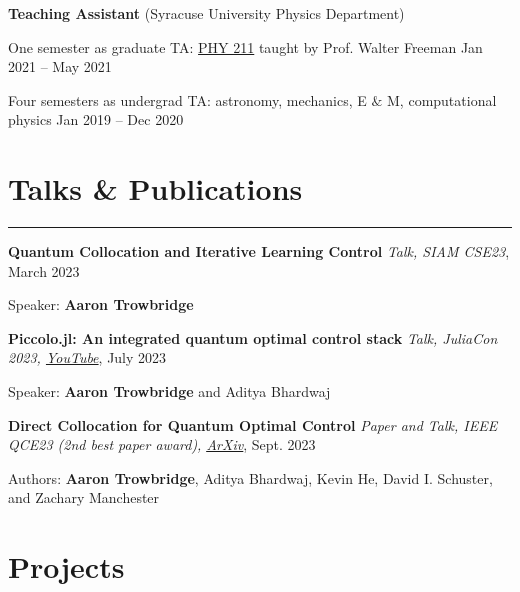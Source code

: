 \documentclass[9pt]{extarticle}
\newcommand{\myline}{\rule[\baselineskip]{\linewidth}{1pt}}
\begin{document}
\vspace{7pt}
\large\textbf{Teaching Assistant} \normalsize (Syracuse University Physics Department)

\begin{compactitem}
\normalsize
\item One semester as graduate TA: \href{https://walterfreeman.github.io/phy211/}{PHY 211} taught by Prof. Walter Freeman \hfill \small Jan 2021 -- May 2021 \normalsize
\item Four semesters as undergrad TA: astronomy, mechanics, E $\&$ M, computational physics  \hfill \small Jan 2019 -- Dec 2020 \normalsize
\end{compactitem}

\section{Talks \& Publications} 
\myline

\textbf{Quantum Collocation and Iterative Learning Control} \hfill \small \textit{Talk, SIAM CSE23}, March 2023 \normalsize
\begin{compactitem}
  \item Speaker: \textbf{Aaron Trowbridge} 
\end{compactitem}

\textbf{Piccolo.jl: An integrated quantum optimal control stack} \hfill \small \textit{Talk, JuliaCon 2023, \href{https://www.youtube.com/watch?v=NBdck6UX0Tc}{YouTube}}, July 2023 \normalsize
\begin{compactitem}
  \item Speaker: \textbf{Aaron Trowbridge} and Aditya Bhardwaj 
\end{compactitem}



\textbf{Direct Collocation for Quantum Optimal Control}  \hfill \small \textit{Paper and Talk, IEEE QCE23 (2nd best paper award), \href{https://arxiv.org/abs/2305.03261}{\underline{ArXiv}}}, Sept. 2023 \normalsize
\begin{compactitem}
  \item Authors: \textbf{Aaron Trowbridge}, Aditya Bhardwaj, Kevin He, David I. Schuster, and Zachary Manchester 
\end{compactitem}







\section{Projects}
\end{document}
